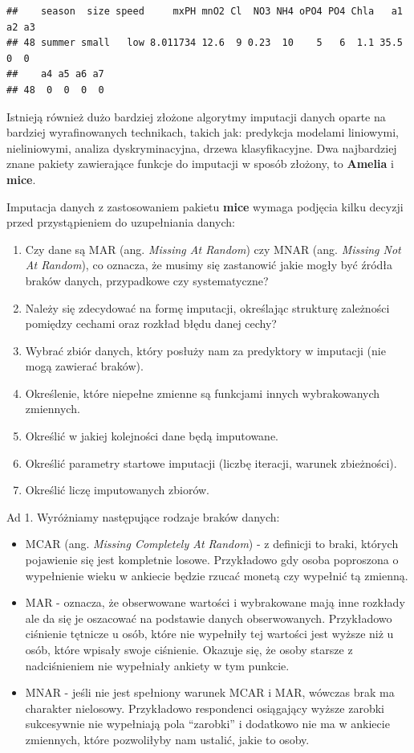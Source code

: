 \documentclass[]{book}
\providecommand{\tightlist}{%
  \setlength{\itemsep}{0pt}\setlength{\parskip}{0pt}}
\theoremstyle{plain}
\theoremstyle{definition}
\theoremstyle{definition}
\theoremstyle{definition}
\theoremstyle{definition}
\theoremstyle{remark}
\begin{document}
\begin{verbatim}
##    season  size speed     mxPH mnO2 Cl  NO3 NH4 oPO4 PO4 Chla   a1 a2 a3
## 48 summer small   low 8.011734 12.6  9 0.23  10    5   6  1.1 35.5  0  0
##    a4 a5 a6 a7
## 48  0  0  0  0
\end{verbatim}

Istnieją również dużo bardziej złożone algorytmy imputacji danych oparte na bardziej wyrafinowanych technikach, takich jak: predykcja modelami liniowymi, nieliniowymi, analiza dyskryminacyjna, drzewa klasyfikacyjne. Dwa najbardziej znane pakiety zawierające funkcje do imputacji w sposób złożony, to \textbf{Amelia} i \textbf{mice}.

Imputacja danych z zastosowaniem pakietu \textbf{mice} wymaga podjęcia kilku decyzji przed przystąpieniem do uzupełniania danych:

\begin{enumerate}
\def\labelenumi{\arabic{enumi}.}
\tightlist
\item
  Czy dane są MAR (ang. \emph{Missing At Random}) czy MNAR (ang. \emph{Missing Not At Random}), co oznacza, że musimy się zastanowić jakie mogły być źródła braków danych, przypadkowe czy systematyczne?
\item
  Należy się zdecydować na formę imputacji, określając strukturę zależności pomiędzy cechami oraz rozkład błędu danej cechy?
\item
  Wybrać zbiór danych, który posłuży nam za predyktory w imputacji (nie mogą zawierać braków).
\item
  Określenie, które niepełne zmienne są funkcjami innych wybrakowanych zmiennych.
\item
  Określić w jakiej kolejności dane będą imputowane.
\item
  Określić parametry startowe imputacji (liczbę iteracji, warunek zbieżności).
\item
  Określić liczę imputowanych zbiorów.
\end{enumerate}

Ad 1. Wyróżniamy następujące rodzaje braków danych:

\begin{itemize}
\tightlist
\item
  MCAR (ang. \emph{Missing Completely At Random}) - z definicji to braki, których pojawienie się jest kompletnie losowe. Przykładowo gdy osoba poproszona o wypełnienie wieku w ankiecie będzie rzucać monetą czy wypełnić tą zmienną.
\item
  MAR - oznacza, że obserwowane wartości i wybrakowane mają inne rozkłady ale da się je oszacować na podstawie danych obserwowanych. Przykładowo ciśnienie tętnicze u osób, które nie wypełniły tej wartości jest wyższe niż u osób, które wpisały swoje ciśnienie. Okazuje się, że osoby starsze z nadciśnieniem nie wypełniały ankiety w tym punkcie.
\item
  MNAR - jeśli nie jest spełniony warunek MCAR i MAR, wówczas brak ma charakter nielosowy. Przykładowo respondenci osiągający wyższe zarobki sukcesywnie nie wypełniają pola ``zarobki'' i dodatkowo nie ma w ankiecie zmiennych, które pozwoliłyby nam ustalić, jakie to osoby.
\end{itemize}
\end{document}
